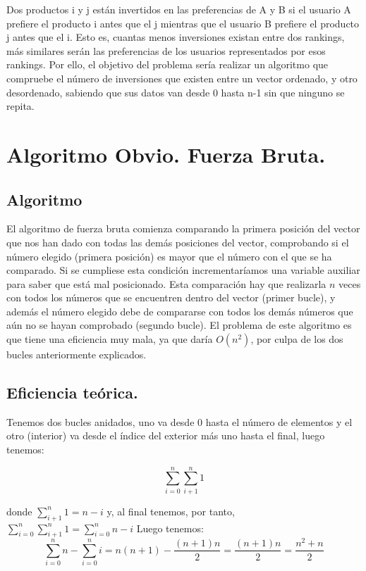 \documentclass[a4paper, 11pt]{article}
\begin{document}
	Dos productos i y j están invertidos en las preferencias de A y B si el usuario
	A prefiere el producto i antes que el j mientras que el usuario B prefiere el
	producto j antes que el i.
	Esto es, cuantas menos inversiones existan entre dos rankings, más similares
	serán las preferencias de los usuarios representados por esos rankings.
	Por ello, el objetivo del problema sería realizar un algoritmo que compruebe el
	número de inversiones que existen entre un vector ordenado, y otro desordenado, sabiendo
	que sus datos van desde 0 hasta n-1 sin que ninguno se repita.
	
\section{Algoritmo Obvio. Fuerza Bruta.}
\subsection{Algoritmo}
	El algoritmo de fuerza bruta comienza comparando la primera posición del vector que nos han dado con todas las demás posiciones del vector, comprobando si el número elegido (primera posición) es mayor que el número con el que se ha comparado. Si se cumpliese esta condición incrementaríamos una variable auxiliar para saber que está mal posicionado. Esta comparación hay que realizarla $n$ veces con todos los números que se encuentren dentro del vector (primer bucle), y además el número elegido debe de compararse con todos los demás números que aún no se hayan comprobado (segundo bucle). El problema de este algoritmo es que tiene una eficiencia muy mala, ya que daría $O(n^2)$, por culpa de los dos bucles anteriormente explicados.
	
\pagebreak
\subsection{Eficiencia teórica.}
Tenemos dos bucles anidados, uno va desde 0 hasta el número de elementos y el otro (interior) va desde el índice del exterior más uno hasta el final, luego tenemos:

$$\sum_{i=0}^{n}\sum_{i+1}^{n}1$$

donde $\sum_{i+1}^{n}1=n-i$ y, al final tenemos, por tanto, $\sum_{i=0}^{n}\sum_{i+1}^{n}1 = \sum_{i=0}^{n}n-i$
Luego tenemos:
$$\sum_{i=0}^{n}n - \sum_{i=0}^{n}i  = n(n+1)-\frac{(n+1)n}{2}= \frac{(n+1)n}{2}=\frac{n^2+n}{2}$$
\end{document}
